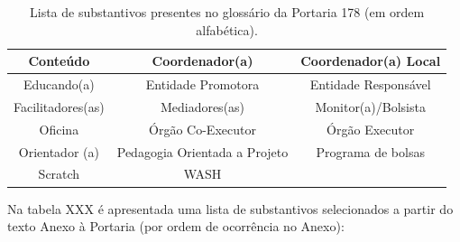 \documentclass[
12pt,		%
openright,	%
twoside,  %
a4paper,			%
chapter=TITLE,		%
english,			%
french,				%
spanish,			%
brazil				%
]{USPSC-classe/USPSC}
\begin{document}
\begin{table}[htb]
\tiny
\caption{\label{443c6ee28b2545c8669e0d3532f6995e639d3416}Lista de substantivos presentes no gloss\'ario da Portaria 178 (em ordem alfab\'etica).}

\centering
\begin{tabular}{|c|c|c|}
\hline
Conte\'udo  &  Coordenador(a)  &  Coordenador(a) Local \\
\hline
Educando(a)  &  Entidade Promotora  &  Entidade Respons\'avel \\
\hline
Facilitadores(as)  &  Mediadores(as)  &  Monitor(a)/Bolsista \\
\hline
Oficina  &  \'Org\~ao Co-Executor  &  \'Org\~ao Executor \\
\hline
Orientador (a)  &  Pedagogia Orientada a Projeto  & Programa de bolsas \\
\hline
Scratch  &  WASH  &  \\
\hline
\end{tabular}
\end{table}


Na tabela XXX \'e apresentada uma lista de substantivos selecionados a partir do texto Anexo \`a Portaria (por ordem de ocorr\^encia no Anexo):
\end{document}
